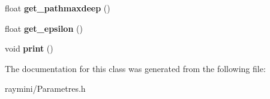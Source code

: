 \begin{DoxyCompactItemize}
\item 
\hypertarget{class_parametres_a6add96f7906219121944a60e297e6dc8}{
float {\bfseries get\_\-pathmaxdeep} ()}
\label{class_parametres_a6add96f7906219121944a60e297e6dc8}

\item 
\hypertarget{class_parametres_a7af9392cc0faf43820fd1a2cb6aee9c7}{
float {\bfseries get\_\-epsilon} ()}
\label{class_parametres_a7af9392cc0faf43820fd1a2cb6aee9c7}

\item 
\hypertarget{class_parametres_abee627ef4465381952390cba771ff6b4}{
void {\bfseries print} ()}
\label{class_parametres_abee627ef4465381952390cba771ff6b4}

\end{DoxyCompactItemize}


The documentation for this class was generated from the following file:\begin{DoxyCompactItemize}
\item 
raymini/Parametres.h\end{DoxyCompactItemize}
